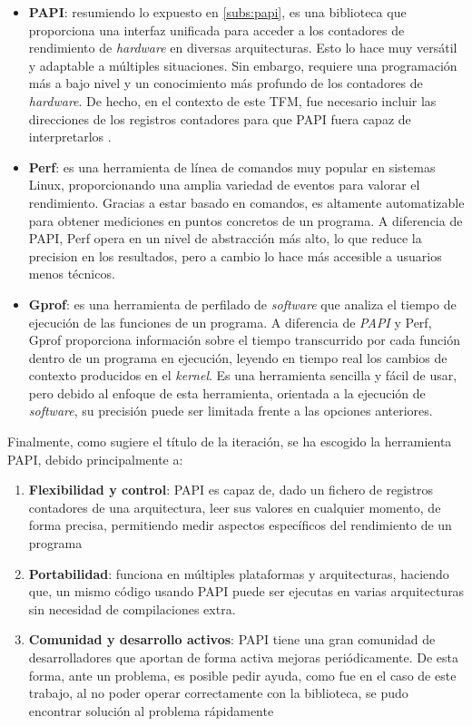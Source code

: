 \begin{itemize}
    \item \textbf{\ac{PAPI}}: resumiendo lo expuesto en \ref{subs:papi}, es una biblioteca que proporciona una interfaz unificada para acceder a los contadores de rendimiento de \textit{hardware} en diversas arquitecturas. Esto lo hace muy versátil y adaptable a múltiples situaciones. Sin embargo, requiere una programación más a bajo nivel y un conocimiento más profundo de los contadores de \textit{hardware}. De hecho, en el contexto de este \ac{TFM}, fue necesario incluir las direcciones de los registros contadores para que \ac{PAPI} fuera capaz de interpretarlos \cite{papi-stackoverflow-referencia} \cite{papi-github-referencia}.

    \item \textbf{Perf}: es una herramienta de línea de comandos muy popular en sistemas Linux, proporcionando una amplia variedad de eventos para valorar el rendimiento. Gracias a estar basado en comandos, es altamente automatizable para obtener mediciones en puntos concretos de un programa. A diferencia de \ac{PAPI}, Perf opera en un nivel de abstracción más alto, lo que reduce la precision en los resultados, pero a cambio lo hace más accesible a usuarios menos técnicos.

    \item \textbf{Gprof}: es una herramienta de perfilado de \textit{software} que analiza el tiempo de ejecución de las funciones de un programa. A diferencia de \textit{PAPI} y Perf, Gprof proporciona información sobre el tiempo transcurrido por cada función dentro de un programa en ejecución, leyendo en tiempo real los cambios de contexto producidos en el \textit{kernel}. Es una herramienta sencilla y fácil de usar, pero debido al enfoque de esta herramienta, orientada a la ejecución de \textit{software}, su precisión puede ser limitada frente a las opciones anteriores.
\end{itemize}

Finalmente, como sugiere el título de la iteración, se ha escogido la herramienta \ac{PAPI}, debido principalmente a:

\begin{enumerate}[noitemsep]
    \item \textbf{Flexibilidad y control}: PAPI es capaz de, dado un fichero de registros contadores de una arquitectura, leer sus valores en cualquier momento, de forma precisa, permitiendo medir aspectos específicos del rendimiento de un programa
    \item \textbf{Portabilidad}: funciona en múltiples plataformas y arquitecturas, haciendo que, un mismo código usando \ac{PAPI} puede ser ejecutas en varias arquitecturas sin necesidad de compilaciones extra.
    \item \textbf{Comunidad y desarrollo activos}: PAPI tiene una gran comunidad de desarrolladores que aportan de forma activa mejoras periódicamente. De esta forma, ante un problema, es posible pedir ayuda, como fue en el caso de este trabajo, al no poder operar correctamente con la biblioteca, se pudo encontrar solución al problema rápidamente \cite{papi-stackoverflow-referencia} \cite{papi-github-referencia}
\end{enumerate}

